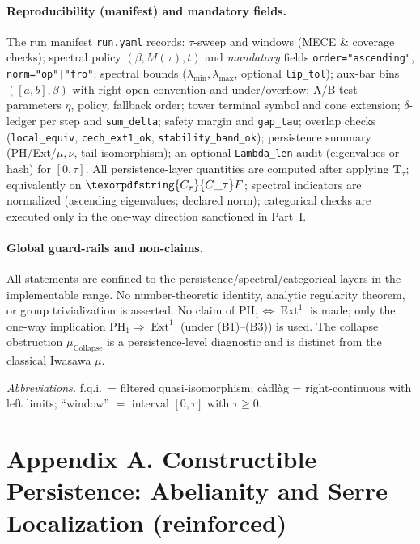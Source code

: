 \documentclass[11pt]{article}
\numberwithin{equation}{section}
\theoremstyle{plain}
\theoremstyle{definition}
\theoremstyle{remark}
\DeclareMathOperator{\Ext}{Ext}
\DeclareRobustCommand{\hyp}{\nobreakdash-}
\theoremstyle{plain}
\theoremstyle{definition}
\numberwithin{equation}{section}
\theoremstyle{definition}
\DeclareRobustCommand{\Ctau}{\texorpdfstring{\ensuremath{C_{\tau}}}{C\_\tau}}
\DeclareRobustCommand{\muc}{\mu_{\mathrm{Collapse}}}
\numberwithin{equation}{section}
\theoremstyle{plain}
\theoremstyle{definition}
\theoremstyle{remark}
\providecommand{\Cfun}[1]{\mathsf{C}_{#1}}
\providecommand{\Ctau}{\Cfun{\tau}}
\providecommand{\muc}{\mu_{\mathrm{Collapse}}}
\begin{document}
\paragraph{Reproducibility (manifest) and mandatory fields.}
The run manifest \texttt{run.yaml} records: \(\tau\)\hyp sweep and windows (MECE \& coverage checks); spectral policy \((\beta,M(\tau),t)\) and \emph{mandatory} fields \texttt{order="ascending"}, \texttt{norm="op"|"fro"}; spectral bounds (\(\lambda_{\min},\lambda_{\max}\), optional \texttt{lip\_tol}); aux\hyp bar bins \(([a,b],\beta)\) with right\hyp open convention and under/overflow; A/B test parameters \(\eta\), policy, fallback order; tower terminal symbol and cone extension; \(\delta\)\hyp ledger per step and \texttt{sum\_delta}; safety margin and \texttt{gap\_tau}; overlap checks (\texttt{local\_equiv}, \texttt{cech\_ext1\_ok}, \texttt{stability\_band\_ok}); persistence summary (PH/Ext/\(\mu,\nu\), tail isomorphism); an optional \texttt{Lambda\_len} audit (eigenvalues or hash) for \([0,\tau]\).
All persistence\hyp layer quantities are computed after applying \(\mathbf{T}_\tau\); equivalently on \(\Ctau F\); spectral indicators are normalized (ascending eigenvalues; declared norm); categorical checks are executed only in the one\hyp way direction sanctioned in Part~I.

\paragraph{Global guard\hyp rails and non\hyp claims.}
All statements are confined to the persistence/spectral/categorical layers in the implementable range.
No number\hyp theoretic identity, analytic regularity theorem, or group trivialization is asserted.
No claim of \(\mathrm{PH}_1\Leftrightarrow \Ext^1\) is made; only the one\hyp way implication \(\mathrm{PH}_1\Rightarrow \Ext^1\) (under (B1)–(B3)) is used.
The collapse obstruction \(\muc\) is a persistence\hyp level diagnostic and is distinct from the classical Iwasawa \(\mu\).

\medskip
\noindent\emph{Abbreviations.}
f.q.i.\ = filtered quasi\hyp isomorphism;\quad
c\`adl\`ag = right\hyp continuous with left limits;\quad
“window” \(=\) interval \([0,\tau]\) with \(\tau\ge0\).



\appendix
\section*{Appendix A. Constructible Persistence: Abelianity and Serre Localization (reinforced)}
\end{document}
